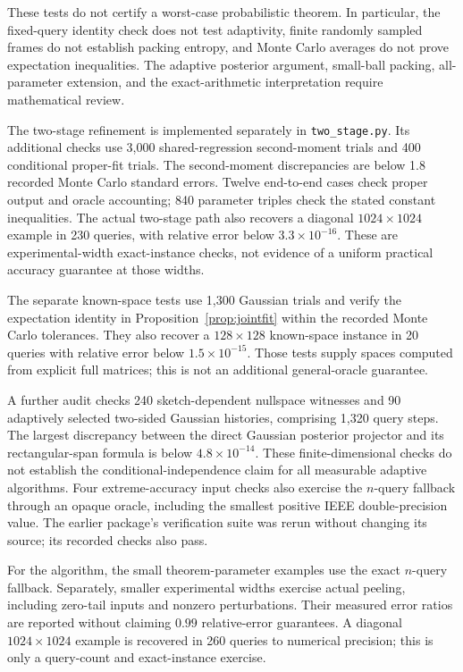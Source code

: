 \documentclass[11pt]{article}
\theoremstyle{remark}
\begin{document}
These tests do not certify a worst-case probabilistic theorem. In particular,
the fixed-query identity check does not test adaptivity, finite randomly
sampled frames do not establish packing entropy, and Monte Carlo averages
do not prove expectation inequalities. The adaptive posterior argument,
small-ball packing, all-parameter extension, and the exact-arithmetic
interpretation require mathematical review.

The two-stage refinement is implemented separately in \texttt{two\_stage.py}.
Its additional checks use 3,000 shared-regression second-moment trials and
400 conditional proper-fit trials. The second-moment discrepancies are below
1.8 recorded Monte Carlo standard errors. Twelve end-to-end cases check
proper output and oracle accounting; 840 parameter triples check the stated
constant inequalities. The actual two-stage path also recovers a diagonal
$1024\times1024$ example in 230 queries, with relative error below
$3.3\times10^{-16}$. These are experimental-width exact-instance checks,
not evidence of a uniform practical accuracy guarantee at those widths.

The separate known-space tests use 1,300 Gaussian trials and verify the
expectation identity in Proposition~\ref{prop:jointfit} within the recorded
Monte Carlo tolerances. They also recover a $128\times128$ known-space
instance in 20 queries with relative error below $1.5\times10^{-15}$.
Those tests supply spaces computed from explicit full matrices; this is not
an additional general-oracle guarantee.

A further audit checks 240 sketch-dependent nullspace witnesses and 90
adaptively selected two-sided Gaussian histories, comprising 1,320 query
steps. The largest discrepancy between the direct Gaussian posterior
projector and its rectangular-span formula is below $4.8\times10^{-14}$.
These finite-dimensional checks do not establish the conditional-independence
claim for all measurable adaptive algorithms. Four extreme-accuracy input
checks also exercise the $n$-query fallback through an opaque oracle, including
the smallest positive IEEE double-precision value. The earlier package's
verification suite was rerun without changing its source; its recorded checks
also pass.

For the algorithm, the small theorem-parameter examples use the exact
$n$-query fallback. Separately, smaller experimental widths exercise actual
peeling, including zero-tail inputs and nonzero perturbations. Their measured
error ratios are reported without claiming $0.99$ relative-error guarantees.
A diagonal $1024\times1024$ example is recovered in 260 queries to numerical
precision; this is only a query-count and exact-instance exercise.
\end{document}
